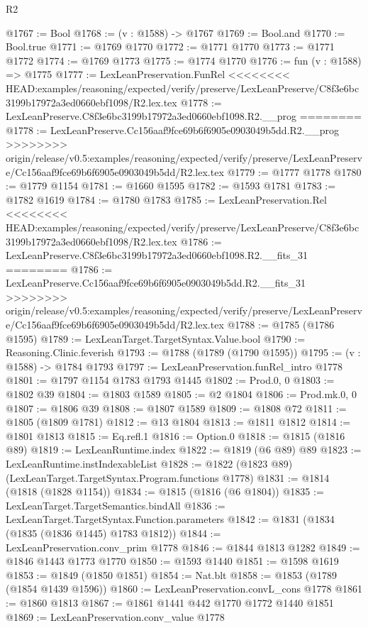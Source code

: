 \begin{lexlean}{R2}
\begin{coremodule}
{{{{{{{{{{{{{{{{{{{{{{{{{{{{{{{{{{{{{{{{{{{{{{{{{{{{{{{{{{{{{{{{{{{{{{{{{{{{{{{{{{{{{{{{{{{{@1767 := Bool
@1768 := (v : @1588) -> @1767
@1769 := Bool.and
@1770 := Bool.true
@1771 := @1769 @1770
@1772 := @1771 @1770
@1773 := @1771 @1772
@1774 := @1769 @1773
@1775 := @1774 @1770
@1776 := fun (v : @1588) => @1775
@1777 := LexLeanPreservation.FunRel
<<<<<<<< HEAD:examples/reasoning/expected/verify/preserve/LexLeanPreserve/C8f3e6bc3199b17972a3ed0660ebf1098/R2.lex.tex
@1778 := LexLeanPreserve.C8f3e6bc3199b17972a3ed0660ebf1098.R2.__prog
========
@1778 := LexLeanPreserve.Cc156aaf9fce69b6f6905e0903049b5dd.R2.__prog
>>>>>>>> origin/release/v0.5:examples/reasoning/expected/verify/preserve/LexLeanPreserve/Cc156aaf9fce69b6f6905e0903049b5dd/R2.lex.tex
@1779 := @1777 @1778
@1780 := @1779 @1154
@1781 := @1660 @1595
@1782 := @1593 @1781
@1783 := @1782 @1619
@1784 := @1780 @1783
@1785 := LexLeanPreservation.Rel
<<<<<<<< HEAD:examples/reasoning/expected/verify/preserve/LexLeanPreserve/C8f3e6bc3199b17972a3ed0660ebf1098/R2.lex.tex
@1786 := LexLeanPreserve.C8f3e6bc3199b17972a3ed0660ebf1098.R2.__fits_31
========
@1786 := LexLeanPreserve.Cc156aaf9fce69b6f6905e0903049b5dd.R2.__fits_31
>>>>>>>> origin/release/v0.5:examples/reasoning/expected/verify/preserve/LexLeanPreserve/Cc156aaf9fce69b6f6905e0903049b5dd/R2.lex.tex
@1788 := @1785 (@1786 @1595)
@1789 := LexLeanTarget.TargetSyntax.Value.bool
@1790 := Reasoning.Clinic.feverish
@1793 := @1788 (@1789 (@1790 @1595))
@1795 := (v : @1588) -> @1784 @1793
@1797 := LexLeanPreservation.funRel_intro @1778
@1801 := @1797 @1154 @1783 @1793 @1445
@1802 := Prod.{0, 0}
@1803 := @1802 @39
@1804 := @1803 @1589
@1805 := @2 @1804
@1806 := Prod.mk.{0, 0}
@1807 := @1806 @39
@1808 := @1807 @1589
@1809 := @1808 @72
@1811 := @1805 (@1809 @1781)
@1812 := @13 @1804
@1813 := @1811 @1812
@1814 := @1801 @1813
@1815 := Eq.refl.{1}
@1816 := Option.{0}
@1818 := @1815 (@1816 @89)
@1819 := LexLeanRuntime.index
@1822 := @1819 (@6 @89) @89
@1823 := LexLeanRuntime.instIndexableList
@1828 := @1822 (@1823 @89) (LexLeanTarget.TargetSyntax.Program.functions @1778)
@1831 := @1814 (@1818 (@1828 @1154))
@1834 := @1815 (@1816 (@6 @1804))
@1835 := LexLeanTarget.TargetSemantics.bindAll
@1836 := LexLeanTarget.TargetSyntax.Function.parameters
@1842 := @1831 (@1834 (@1835 (@1836 @1445) @1783 @1812))
@1844 := LexLeanPreservation.conv_prim @1778
@1846 := @1844 @1813 @1282
@1849 := @1846 @1443 @1773 @1770
@1850 := @1593 @1440
@1851 := @1598 @1619
@1853 := @1849 (@1850 @1851)
@1854 := Nat.blt
@1858 := @1853 (@1789 (@1854 @1439 @1596))
@1860 := LexLeanPreservation.convL_cons @1778
@1861 := @1860 @1813
@1867 := @1861 @1441 @442 @1770 @1772 @1440 @1851
@1869 := LexLeanPreservation.conv_value @1778
}}}}}}}}}}}}}}}}}}}}}}}}}}}}}}}}}}}}}}}}}}}}}}}}}}}}}}}}}}}}}}}}}}}}}}}}}}}}}}}}}}}}}}}}}}}}
\end{coremodule}
\end{lexlean}
